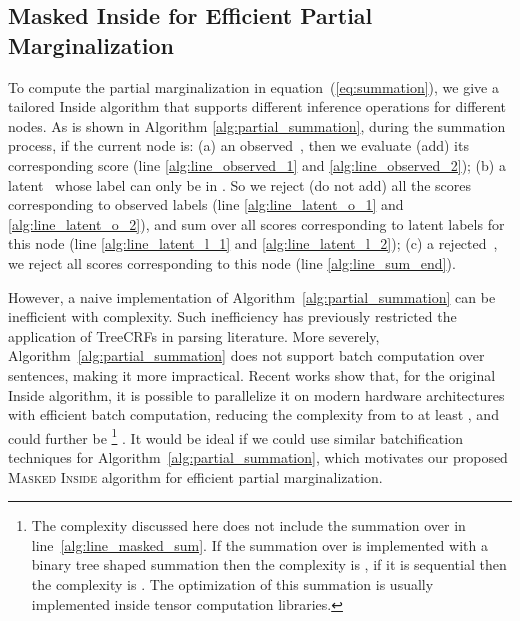 \subsection{Masked Inside for Efficient Partial Marginalization}
\label{ssec:masked_inside}
To compute the partial marginalization in equation~(\ref{eq:summation}), we give a tailored Inside algorithm that supports different inference operations for different nodes.
As is shown in Algorithm \ref{alg:partial_summation}, during the summation process,
if the current node is:
(a) an observed~, then we evaluate (add) its corresponding score (line \ref{alg:line_observed_1} and \ref{alg:line_observed_2}); 
(b) a latent~\scalebox{0.8}{} whose label can only be in .
So we reject (do not add) all the scores corresponding to observed labels   (line \ref{alg:line_latent_o_1} and \ref{alg:line_latent_o_2}), and sum over all scores corresponding to latent labels  for this node (line \ref{alg:line_latent_l_1} and \ref{alg:line_latent_l_2}); 
(c) a rejected~, we reject all scores corresponding to this node (line \ref{alg:line_sum_end}). 

However, a naive implementation of Algorithm~\ref{alg:partial_summation} can be inefficient with  complexity. 
Such inefficiency has previously restricted the application of TreeCRFs in parsing literature. 
More severely, Algorithm~\ref{alg:partial_summation} does not support batch computation over sentences, making it more impractical.
Recent works show that, for the original Inside algorithm, it is possible to parallelize it on modern hardware architectures with efficient batch computation, reducing the complexity from  to at least , and could further be \footnote{
The complexity discussed here does not include the summation over  in line~\ref{alg:line_masked_sum}. If the summation over  is implemented with a binary tree shaped summation then the complexity is , if it is sequential then the complexity is . The optimization of this summation is usually implemented inside tensor computation libraries.
}
\citep{Rush2020TorchStructDS, Zhang2020FastAA}. 
It would be ideal if we could use similar batchification techniques for Algorithm~\ref{alg:partial_summation}, which motivates our proposed \textsc{Masked Inside} algorithm for efficient partial marginalization. 







